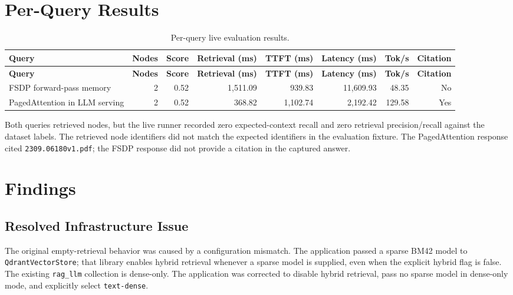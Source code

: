 \documentclass[11pt,a4paper]{article}
\begin{document}
\section{Per-Query Results}

\small
\begin{longtable}{>{\raggedright\arraybackslash}p{}rrrrrrr}
\caption{Per-query live evaluation results.}\\
\toprule
\textbf{Query} & \textbf{Nodes} & \textbf{Score} & \textbf{Retrieval (ms)} & \textbf{TTFT (ms)} & \textbf{Latency (ms)} & \textbf{Tok/s} & \textbf{Citation} \\
\midrule
\endfirsthead
\toprule
\textbf{Query} & \textbf{Nodes} & \textbf{Score} & \textbf{Retrieval (ms)} & \textbf{TTFT (ms)} & \textbf{Latency (ms)} & \textbf{Tok/s} & \textbf{Citation} \\
\midrule
\endhead
FSDP forward-pass memory & 2 & 0.52 & 1,511.09 & 939.83 & 11,609.93 & 48.35 & No \\
PagedAttention in LLM serving & 2 & 0.52 & 368.82 & 1,102.74 & 2,192.42 & 129.58 & Yes \\
\bottomrule
\end{longtable}
\normalsize

Both queries retrieved nodes, but the live runner recorded zero expected-context recall and zero retrieval precision/recall against the dataset labels. The retrieved node identifiers did not match the expected identifiers in the evaluation fixture. The PagedAttention response cited \texttt{2309.06180v1.pdf}; the FSDP response did not provide a citation in the captured answer.

\section{Findings}

\subsection{Resolved Infrastructure Issue}
The original empty-retrieval behavior was caused by a configuration mismatch. The application passed a sparse BM42 model to \texttt{QdrantVectorStore}; that library enables hybrid retrieval whenever a sparse model is supplied, even when the explicit hybrid flag is false. The existing \texttt{rag\_llm} collection is dense-only. The application was corrected to disable hybrid retrieval, pass no sparse model in dense-only mode, and explicitly select \texttt{text-dense}.
\end{document}
